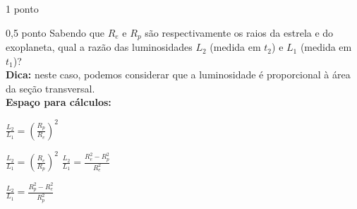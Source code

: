 \documentclass{../lista}
\begin{document}
\begin{questao}{1 ponto}
		\begin{pergunta}{0,5 ponto}
			Sabendo que $R_e$ e $R_p$ são respectivamente os raios da estrela e do exoplaneta, qual a razão das luminosidades $L_2$ (medida em $t_2$) e $L_1$ (medida em $t_1$)? \\
			\textbf{Dica:} neste caso, podemos considerar que a luminosidade é proporcional à área da seção transversal. \\

			\textbf{Espaço para cálculos:}

			\begin{multicols}{2} \begin{alternativas}
				\item $\frac{L_2}{L_1} = \left( \frac{R_p}{R_e} \right)^2$
				\item $\frac{L_2}{L_1} = \left( \frac{R_e}{R_p} \right)^2 $
				\alternativaMarcada $\frac{L_2}{L_1} = \frac{R_e^2-R_p^2}{R_e^2}$
				\item $\frac{L_2}{L_1} = \frac{R_p^2-R_e^2}{R_p^2}$
			\end{alternativas} \end{multicols}
		\end{pergunta}
	\end{questao}
	
	\encerramento
\end{document}
